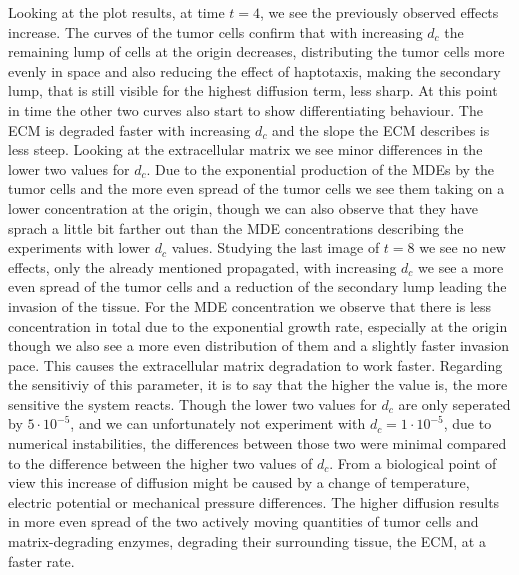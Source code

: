 Looking at the plot results, at time $t=4$, we see the previously observed effects increase. The curves of the tumor cells confirm that with increasing $d_c$ the remaining lump of cells at the origin decreases, distributing the tumor cells more evenly in space and also reducing the effect of haptotaxis, making the secondary lump, that is still visible for the highest diffusion term, less sharp. At this point in time the other two curves also start to show differentiating behaviour. The ECM is degraded faster with increasing $d_c$ and the slope the ECM describes is less steep. Looking at the extracellular matrix we see minor differences in the lower two values for $d_c$. Due to the exponential production of the MDEs by the tumor cells and the more even spread of the tumor cells we see them taking on a lower concentration at the origin, though we can also observe that they have sprach a little bit farther out than the MDE concentrations describing the experiments with lower $d_c$ values.\newline
Studying the last image of $t=8$ we see no new effects, only the already mentioned propagated, with increasing $d_c$ we see a more even spread of the tumor cells and a reduction of the secondary lump leading the invasion of the tissue. For the MDE concentration we observe that there is less concentration in total due to the exponential growth rate, especially at the origin though we also see a more even distribution of them and a slightly faster invasion pace. This causes the extracellular matrix degradation to work faster.\newline 
Regarding the sensitiviy of this parameter, it is to say that the higher the value is, the more sensitive the system reacts. Though the lower two values for $d_c$ are only seperated by $5\cdot 10^{-5}$, and we can unfortunately not experiment with $d_c=1 \cdot 10^{-5}$, due to numerical instabilities, the differences between those two were minimal compared to the difference between the higher two values of $d_c$.\newline 
From a biological point of view this increase of diffusion might be caused by a change of temperature, electric potential or mechanical pressure differences. The higher diffusion results in more even spread of the two actively moving quantities of tumor cells and matrix-degrading enzymes, degrading their surrounding tissue, the ECM, at a faster rate.

